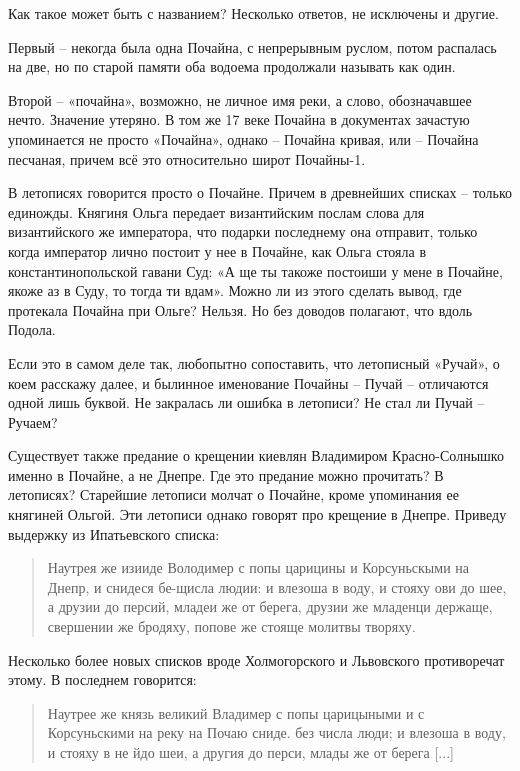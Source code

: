 Как такое может быть с названием? Несколько ответов, не исключены и другие.

Первый – некогда была одна Почайна, с непрерывным руслом, потом распалась на две, но по старой памяти оба водоема продолжали называть как один.

Второй – «почайна», возможно, не личное имя реки, а слово, обозначавшее нечто. Значение утеряно. В том же 17 веке Почайна в документах зачастую упоминается не просто «Почайна», однако – Почайна кривая, или – Почайна песчаная, причем всё это относительно широт Почайны-1.

В летописях говорится просто о Почайне. Причем в древнейших списках – только единожды. Княгиня Ольга передает византийским послам слова для византийского же императора, что подарки последнему она отправит, только когда император лично постоит у нее в Почайне, как Ольга стояла в константинопольской гавани Суд: «А ще ты такоже постоиши у мене в Почайне, якоже аз в Суду, то тогда ти вдам». Можно ли из этого сделать вывод, где протекала Почайна при Ольге? Нельзя. Но без доводов полагают, что вдоль Подола.

Если это в самом деле так, любопытно сопоставить, что летописный «Ручай», о коем расскажу далее, и былинное именование Почайны – Пучай – отличаются одной лишь буквой. Не закралась ли ошибка в летописи? Не стал ли Пучай – Ручаем?

Существует также предание о крещении киевлян Владимиром Красно-Солнышко именно в Почайне, а не Днепре. Где это предание можно прочитать? В летописях? Старейшие летописи молчат о Почайне, кроме упоминания ее княгиней Ольгой. Эти летописи однако говорят про крещение в Днепре. Приведу выдержку из Ипатьевского списка:

\begin{quotation}
Наутрея же изииде Володимер с попы царицины и Корсуньскыми на Днепр, и снидеся бе-щисла людии: и влезоша в воду, и стояху ови до шее, а друзии до персий, младеи же от берега, друзии же младенци держаще, свершении же бродяху, попове же стояще молитвы творяху.
\end{quotation}

Несколько более новых списков вроде Холмогорского и Львовского противоречат этому. В последнем говорится:

\begin{quotation}
Наутрее же князь великий Владимер с попы царицыными и с Корсуньскими на реку на Почаю сниде. без числа люди; и влезоша в воду, и стояху в не йдо шеи, а другия до перси, млады же от берега [...]
\end{quotation}

